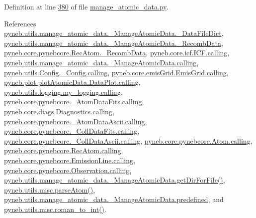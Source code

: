 Definition at line \hyperlink{manage__atomic__data_8py_source_l00380}{380} of file \hyperlink{manage__atomic__data_8py_source}{manage\+\_\+atomic\+\_\+data.\+py}.



References \hyperlink{manage__atomic__data_8py_source_l00078}{pyneb.\+utils.\+manage\+\_\+atomic\+\_\+data.\+\_\+\+Manage\+Atomic\+Data.\+\_\+\+Data\+File\+Dict}, \hyperlink{manage__atomic__data_8py_source_l00025}{pyneb.\+utils.\+manage\+\_\+atomic\+\_\+data.\+\_\+\+Manage\+Atomic\+Data.\+\_\+\+Recomb\+Data}, \hyperlink{pynebcore_8py_source_l02653}{pyneb.\+core.\+pynebcore.\+Rec\+Atom.\+\_\+\+Recomb\+Data}, \hyperlink{icf_8py_source_l00016}{pyneb.\+core.\+icf.\+I\+C\+F.\+calling}, \hyperlink{manage__atomic__data_8py_source_l00018}{pyneb.\+utils.\+manage\+\_\+atomic\+\_\+data.\+\_\+\+Manage\+Atomic\+Data.\+calling}, \hyperlink{_config_8py_source_l00032}{pyneb.\+utils.\+Config.\+\_\+\+Config.\+calling}, \hyperlink{emis_grid_8py_source_l00041}{pyneb.\+core.\+emis\+Grid.\+Emis\+Grid.\+calling}, \hyperlink{plot_atomic_data_8py_source_l00042}{pyneb.\+plot.\+plot\+Atomic\+Data.\+Data\+Plot.\+calling}, \hyperlink{logging_8py_source_l00044}{pyneb.\+utils.\+logging.\+my\+\_\+logging.\+calling}, \hyperlink{pynebcore_8py_source_l00090}{pyneb.\+core.\+pynebcore.\+\_\+\+Atom\+Data\+Fits.\+calling}, \hyperlink{diags_8py_source_l00169}{pyneb.\+core.\+diags.\+Diagnostics.\+calling}, \hyperlink{pynebcore_8py_source_l00311}{pyneb.\+core.\+pynebcore.\+\_\+\+Atom\+Data\+Ascii.\+calling}, \hyperlink{pynebcore_8py_source_l00568}{pyneb.\+core.\+pynebcore.\+\_\+\+Coll\+Data\+Fits.\+calling}, \hyperlink{pynebcore_8py_source_l00918}{pyneb.\+core.\+pynebcore.\+\_\+\+Coll\+Data\+Ascii.\+calling}, \hyperlink{pynebcore_8py_source_l01175}{pyneb.\+core.\+pynebcore.\+Atom.\+calling}, \hyperlink{pynebcore_8py_source_l02572}{pyneb.\+core.\+pynebcore.\+Rec\+Atom.\+calling}, \hyperlink{pynebcore_8py_source_l03263}{pyneb.\+core.\+pynebcore.\+Emission\+Line.\+calling}, \hyperlink{pynebcore_8py_source_l03419}{pyneb.\+core.\+pynebcore.\+Observation.\+calling}, \hyperlink{manage__atomic__data_8py_source_l00144}{pyneb.\+utils.\+manage\+\_\+atomic\+\_\+data.\+\_\+\+Manage\+Atomic\+Data.\+get\+Dir\+For\+File()}, \hyperlink{misc_8py_source_l00117}{pyneb.\+utils.\+misc.\+parse\+Atom()}, \hyperlink{manage__atomic__data_8py_source_l00084}{pyneb.\+utils.\+manage\+\_\+atomic\+\_\+data.\+\_\+\+Manage\+Atomic\+Data.\+predefined}, and \hyperlink{misc_8py_source_l00053}{pyneb.\+utils.\+misc.\+roman\+\_\+to\+\_\+int()}.



